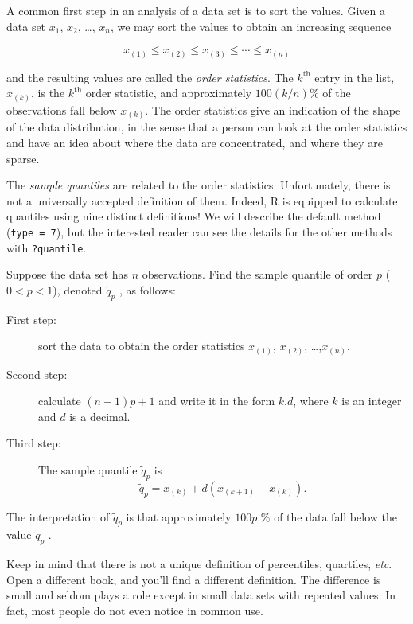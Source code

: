 \documentclass[captions=tableheading]{scrbook}
\begin{document}
A common first step in an analysis of a data set is to sort the values. Given a data set \(x_{1}\), \(x_{2}\), \ldots{}, \(x_{n}\), we may sort the values to obtain an increasing sequence

\begin{equation} 
x_{(1)}\leq x_{(2)}\leq x_{(3)}\leq\cdots\leq x_{(n)}
\end{equation}

and the resulting values are called the \emph{order statistics}. The \(k^{\mathrm{th}}\) entry in the list, \(x_{(k)}\), is the \(k^{\mathrm{th}}\) order statistic, and approximately \(100(k/n)\)\% of the observations fall below \(x_{(k)}\). The order statistics give an indication of the shape of the data distribution, in the sense that a person can look at the order statistics and have an idea about where the data are concentrated, and where they are sparse.

The \emph{sample quantiles} are related to the order statistics. Unfortunately, there is not a universally accepted definition of them. Indeed, \textsf{R} is equipped to calculate quantiles using nine distinct definitions! We will describe the default method (\texttt{type = 7}), but the interested reader can see the details for the other methods with \texttt{?quantile}.

Suppose the data set has \(n\) observations. Find the sample quantile of order \(p\) (\(0<p<1\)), denoted \(\tilde{q}_{p}\) , as follows: 

\begin{description}
\item[First step:] sort the data to obtain the order statistics \(x_{(1)}\), \(x_{(2)}\), \ldots{},\(x_{(n)}\).
\item[Second step:] calculate \((n-1)p+1\) and write it in the form \(k.d\), where \(k\) is an integer and \(d\) is a decimal.
\item[Third step:] The sample quantile \(\tilde{q}_{p}\) is
   \begin{equation}
      \tilde{q}_{p}=x_{(k)}+d(x_{(k+1)}-x_{(k)}).
   \end{equation}
\end{description}


The interpretation of \(\tilde{q}_{p}\) is that approximately \(100p\) \% of the data fall below the value \(\tilde{q}_{p}\) . 

Keep in mind that there is not a unique definition of percentiles, quartiles, \emph{etc}. Open a different book, and you'll find a different definition. The difference is small and seldom plays a role except in small data sets with repeated values. In fact, most people do not even notice in common use.
\end{document}
